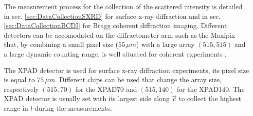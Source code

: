 The measurement process for the collection of the scattered intensity is detailed in sec. \ref{sec:DataCollectionSXRD} for surface x-ray diffraction and in sec. \ref{sec:DataCollectionBCDI} for Bragg coherent diffraction imaging.
Different detectors can be accomodated on the diffractometer arm such as the Maxipix \parencite{ponchut_maxipix_2011} that, by combining a small pixel size ($55 \, \mu m$) with a large array $(515, 515)$ and a large dynamic counting range, is well situated for coherent experiments \parencite{Schavkan2013, Li2020}.

The XPAD detector \parencite{Basolo2005, Dawiec_2016} is used for surface x-ray diffraction experiments, its pixel size is equal to $75 \, \mu m$.
Different chips can be used that change the array size, respectively  $(515, 70)$ for the XPAD70 and $(515, 140)$ for the XPAD140.
The XPAD detector is usually set with its largest side along $\vec{c}$ to collect the highest range in $l$ during the measurements.